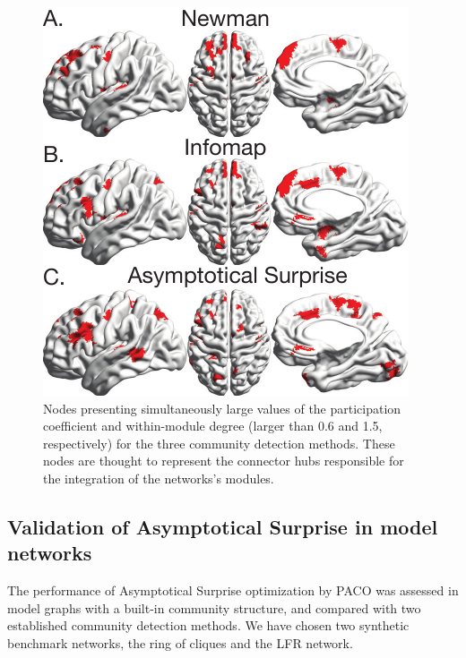 \begin{figure}[htb!]
\includegraphics[width=\textwidth]{images/pacopaperfigure9.pdf}
\caption{Nodes presenting simultaneously large values of the participation coefficient and within-module degree (larger than 0.6 and 1.5, respectively) for the three community detection methods. These nodes are thought to represent the connector hubs responsible for the integration of the networks's modules.
}
\label{fig:hubclassification_threshold}
\end{figure}

\subsection{Validation of Asymptotical Surprise in model networks}
The performance of Asymptotical Surprise optimization by PACO was assessed in model graphs with a built-in community structure, and compared with two established community detection methods. We have chosen two synthetic benchmark networks, the ring of cliques and the LFR network.

